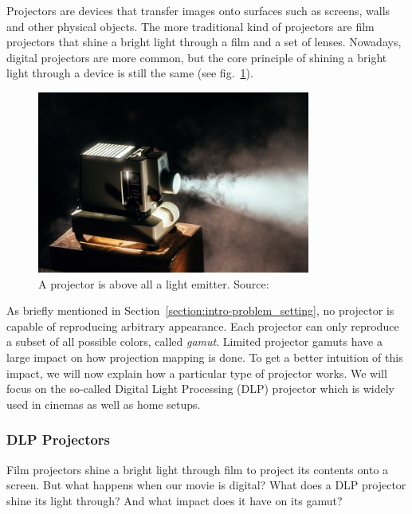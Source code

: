Projectors are devices that transfer images onto surfaces such as screens, walls and other physical objects. The more traditional kind of projectors are film projectors that shine a bright light through a film and a set of lenses. Nowadays, digital projectors are more common, but the core principle of shining a bright light through a device is still the same (see fig.~\ref{fig:background_projector}).

\begin{figure}[ht]
    \centering
    \includegraphics[width=0.8\textwidth]{images/02-projector.jpg}
    \caption{A projector is above all a light emitter. Source: \citet{ImageProjector}}
    \label{fig:background_projector}
\end{figure}

As briefly mentioned in Section~\ref{section:intro-problem_setting}, no projector is capable of reproducing arbitrary appearance. Each projector can only reproduce a subset of all possible colors, called \textit{gamut}. Limited projector gamuts have a large impact on how projection mapping is done. To get a better intuition of this impact, we will now explain how a particular type of projector works. We will focus on the so-called Digital Light Processing (DLP) projector which is widely used in cinemas as well as home setups.

\subsubsection{DLP Projectors}
\label{section:background-projection_mapping-projectors-DLP}

Film projectors shine a bright light through film to project its contents onto a screen. But what happens when our movie is digital? What does a DLP projector shine its light through? And what impact does it have on its gamut?

